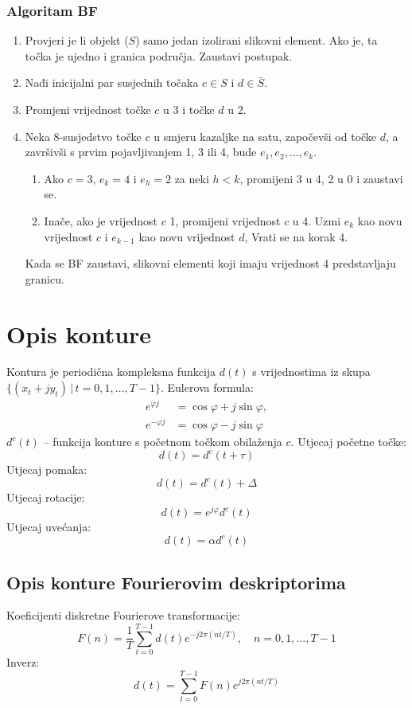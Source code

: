 \documentclass[11pt,english]{article}
\begin{document}
\subsubsection{Algoritam BF}
\begin{enumerate}
  \item Provjeri je li objekt ($S$) samo jedan izolirani slikovni element. Ako je, ta točka je ujedno i granica područja. Zaustavi postupak.
  \item Nađi inicijalni par susjednih točaka $c \in S$ i $d \in \bar S$.
  \item Promjeni vrijednost točke $c$ u 3 i točke $d$ u 2.
  \item Neka 8-susjedstvo točke $c$ u smjeru kazaljke na satu, započevši od točke $d$, a završivši s prvim pojavljivanjem 1, 3 ili 4, bude $e_1, e_2, \ldots, e_k$.
  \begin{enumerate}
    \item Ako $c=3$, $e_k = 4$ i $e_h=2$ za neki $h<k$, promijeni 3 u 4, 2 u 0 i zaustavi se.
    \item Inače, ako je vrijednost $c$ 1, promijeni vrijednost $c$ u 4. Uzmi $e_k$ kao novu vrijednost $c$ i $e_{k-1}$ kao novu vrijednost $d$, Vrati se na korak 4.
  \end{enumerate}
  Kada se BF zaustavi, slikovni elementi koji imaju vrijednost 4 predstavljaju granicu.
\end{enumerate}

\section{Opis konture}
Kontura je periodična kompleksna funkcija $d(t)$ s vrijednostima iz skupa $\{(x_t + jy_t)\, |\, t = 0, 1, \ldots, T-1\}$.
Eulerova formula:
\begin{align*}
e^{\varphi j} &= \cos \varphi + j \sin \varphi,\\
e^{-\varphi j} &= \cos \varphi - j \sin \varphi
\end{align*}
$d^c(t)$ -- funkcija konture s početnom točkom obilaženja $c$.
Utjecaj početne točke:
$$d(t) = d^c(t+\tau)$$
Utjecaj pomaka:
$$d(t)=d^c(t)+\Delta$$
Utjecaj rotacije:
$$d(t)=e^{j\varphi}d^c(t)$$
Utjecaj uvećanja:
$$d(t)=\alpha d^c(t)$$

\subsection{Opis konture Fourierovim deskriptorima}
Koeficijenti diskretne Fourierove transformacije:
$$F(n)=\dfrac{1}{T} \sum^{T-1}_{t=0} d(t)e^{-j2\pi (nt/T)}, \quad n = 0, 1, \ldots, T-1$$
Inverz:
$$d(t) = \sum^{T-1}_{t=0} F(n)e^{j2\pi (nt/T)}$$
\end{document}
